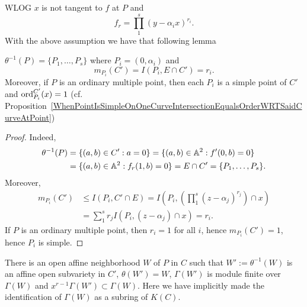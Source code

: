         WLOG $x$ is not tangent to $f$ at $P$ and 
        $$
            f_r = \prod_1^s (y-\alpha_ix)^{r_i}.
        $$
        With the above assumption we have that following lemma 
        \begin{lemma}\label{BlowupTurnsMultiplePointsToSimplePoints}
            $\theta^{-1}(P)=\{P_1,\dots,P_s\}$ where $P_i = (0,\alpha_i)$ and 
            $$
                m_{P_i}(C')=I(P_i,E\cap C') = r_i.
            $$
            Moreover, if $P$ is an ordinary multiple point, then each $P_i$ is a simple point of $C'$ and $\mathrm{ord}_{P_i}^{C'}(x)=1$ (cf. Proposition~\ref{WhenPointIsSimpleOnOneCurveIntersectionEqualsOrderWRTSaidCurveAtPoint})
        \end{lemma}
        \begin{proof}
            Indeed,
           \begin{align*}
                \theta^{-1}(P) &= \{(a,b)\in C' : a=0\}= \{(a,b)\in \mathbb{A}^2 : f'(0,b)=0\}\\
                 &= \{(a,b)\in \mathbb{A}^2 : f_r(1,b)=0\}=  E \cap C' = \{P_1,\dots,P_s\}.
           \end{align*}
           Moreover,
           \begin{align*}
                m_{P_i}(C') &\leq I\left(P_i,C'\cap E\right) = I\left(P_i,\left(\prod_1^s (z-\alpha_j)^{r_j}\right) \cap x\right)\\ 
                &= \sum_1^s r_j I(P_i,(z-\alpha_j)\cap x) = r_i.
           \end{align*}
           If $P$ is an ordinary multiple point, then $r_i=1$ for all $i$, hence $m_{P_i}(C')=1$, hence $P_i$ is simple.  
        \end{proof}
        \begin{lemma}\label{AffineCaseTechnicalLemma}
            There is an open affine neighborhood $W$ of $P$ in $C$ such that $W':=\theta^{-1}(W)$ is an affine open subvariety in $C'$, $\theta(W')=W$, $\Gamma(W')$ is module finite over $\Gamma(W)$ and $x^{r-1}\Gamma(W')\subset \Gamma(W)$. Here we have implicitly made the identification of $\Gamma(W)$ as a subring of $K(C)$. 
        \end{lemma}
